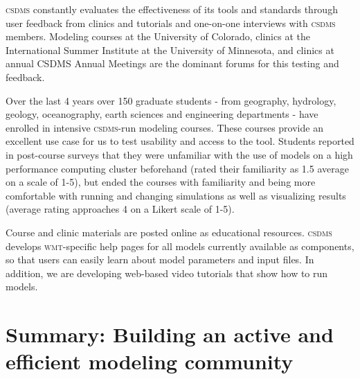 \documentclass[11pt, oneside]{amsart}
\DeclareRobustCommand{\csdms}{\textsc{csdms}}
\DeclareRobustCommand{\wmt}{\textsc{wmt}}
\begin{document}

\csdms{} constantly evaluates the effectiveness of its tools and standards
through user feedback from clinics and tutorials and one-on-one interviews
with \csdms{} members.  Modeling courses at the University of Colorado,
clinics at the International Summer Institute at the University of Minnesota,
and clinics at annual CSDMS Annual Meetings are the dominant forums for
this testing and feedback. 


Over the last 4 years over 150 graduate students - from geography, hydrology,
geology, oceanography, earth sciences and engineering departments - have
enrolled in intensive \csdms{}-run modeling courses. These courses
provide an excellent use case for us to test usability and access to the
tool. Students reported in post-course surveys that they were unfamiliar with
the use of models on a high performance computing cluster beforehand (rated
their familiarity as 1.5 average on a scale of 1-5), but ended the courses
with familiarity and being more comfortable with running and changing
simulations as well as visualizing results (average rating approaches 4 on
a Likert scale of 1-5). 


Course and clinic materials are posted online as educational resources.
\csdms{} develops \wmt{}-specific help pages for all models currently
available as components, so that users can easily learn about model
parameters and input files. In addition, we are developing web-based video
tutorials that show how to run models.

\section{Summary: Building an active and efficient modeling community}
\end{document}

